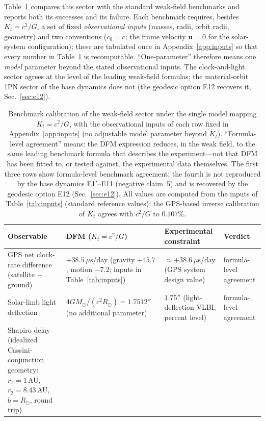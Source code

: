 \documentclass[aps,reprint,amsmath,amssymb,nofootinbib,superscriptaddress,floatfix]{revtex4-2}
\newcommand{\vect}[1]{\bm{#1}}
\newcommand{\Kt}{K_t}
\begin{document}
Table~\ref{tab:calib} compares this sector with the standard
weak-field benchmarks and reports both its successes and its failure.
Each benchmark requires, besides $\Kt = c^2/G$, a set of fixed
\emph{observational inputs} (masses, radii, orbit radii, geometry) and
two conventions ($c_0 = c$; the frame velocity $\vect{u} = 0$ for the
solar-system configuration); these are tabulated once in
Appendix~\ref{app:inputs} so that every number in
Table~\ref{tab:calib} is recomputable.
``One-parameter'' therefore means one \emph{model} parameter beyond
the stated observational inputs.
The clock-and-light sector agrees at the level of the leading
weak-field formulas; the material-orbit 1PN sector of the base
dynamics does not (the geodesic option E12 recovers it,
Sec.~\ref{sec:e12}).

\begin{table}[t]
\caption{\label{tab:calib}%
Benchmark calibration of the weak-field sector under the single model
mapping $\Kt = c^2/G$, with the observational inputs of each row fixed
in Appendix~\ref{app:inputs} (no adjustable model parameter beyond
$\Kt$).
``Formula-level agreement'' means: the DFM expression reduces, in the
weak field, to the same leading benchmark formula that describes the
experiment---not that DFM has been fitted to, or tested against, the
experimental data themselves.
The first three rows show formula-level benchmark agreement; the
fourth is not reproduced by the base dynamics E1$'$--E11 (negative
claim~5) and is recovered by the geodesic option E12
(Sec.~\ref{sec:e12}).
All values are computed from the inputs of Table~\ref{tab:inputs}
(standard reference values); the GPS-based inverse calibration of
$\Kt$ agrees with
$c^2/G$ to $0.107\%$.}
\begin{ruledtabular}
\begin{tabular}{p{}p{}p{}p{}}
Observable & DFM ($\Kt = c^2/G$) & Experimental constraint & Verdict \\
\hline
GPS net clock-rate difference (satellite $-$ ground) &
$+38.5\ \mu$s/day (gravity $+45.7$, motion $-7.2$; inputs in
Table~\ref{tab:inputs}) &
$\approx +38.6\ \mu$s/day (GPS system design value) &
formula-level agreement \\
Solar-limb light deflection &
$4GM_\odot/(c^2R_\odot) = 1.7512''$ (no additional parameter) &
$1.75''$ (light-deflection VLBI, percent level) &
formula-level agreement \\
Shapiro delay (idealized Cassini-conjunction geometry:
$r_1 = 1\,$AU, $r_2 = 8.43\,$AU, $b = R_\odot$, round trip) &

\end{tabular}
\end{ruledtabular}
\end{table}
\end{document}
